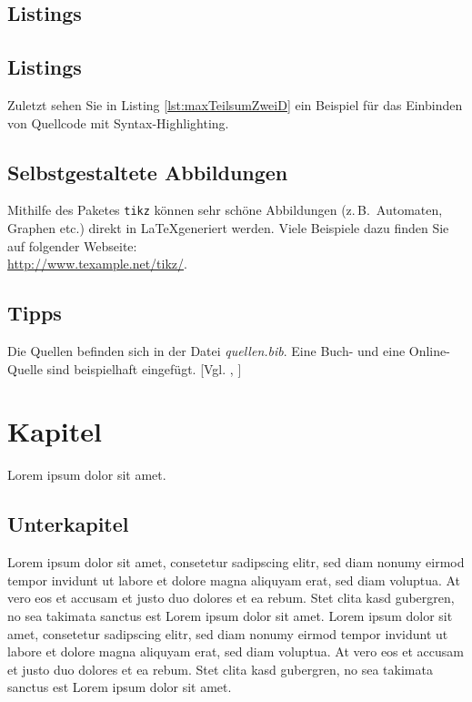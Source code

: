 \documentclass[12pt,a4paper,bibliography=totocnumbered,listof=totocnumbered]{article}
\begin{document}
\subsection{Listings}
\subsection{Listings}
Zuletzt sehen Sie in Listing \ref{lst:maxTeilsumZweiD} ein Beispiel für das Einbinden von Quellcode mit Syntax-Highlighting.

\vspace{1em}


\subsection{Selbstgestaltete Abbildungen}
Mithilfe des Paketes \texttt{tikz} können sehr schöne Abbildungen (z.\,B.\ Automaten, Graphen etc.) direkt in \LaTeX generiert werden. Viele Beispiele dazu finden Sie auf folgender Webseite:\\[1em]
\hspace*{3cm}\url{http://www.texample.net/tikz/}.

\subsection{Tipps}
Die Quellen befinden sich in der Datei \textit{quellen.bib}. Eine Buch- und eine Online-Quelle sind beispielhaft eingefügt. [Vgl. \cite{buch}, \cite{online}]

\pagebreak

\section{Kapitel}
Lorem ipsum dolor sit amet.

\subsection{Unterkapitel}
Lorem ipsum dolor sit amet, consetetur sadipscing elitr, sed diam nonumy eirmod tempor invidunt ut labore et dolore magna aliquyam erat, sed diam voluptua. At vero eos et accusam et justo duo dolores et ea rebum. Stet clita kasd gubergren, no sea takimata sanctus est Lorem ipsum dolor sit amet. Lorem ipsum dolor sit amet, consetetur sadipscing elitr, sed diam nonumy eirmod tempor invidunt ut labore et dolore magna aliquyam erat, sed diam voluptua. At vero eos et accusam et justo duo dolores et ea rebum. Stet clita kasd gubergren, no sea takimata sanctus est Lorem ipsum dolor sit amet.
\end{document}
